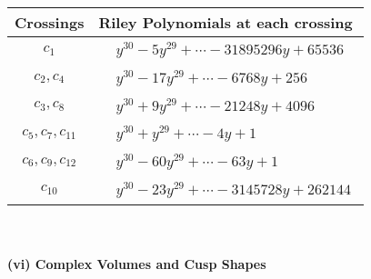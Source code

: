 \documentclass[1p]{elsarticle_modified}
\theoremstyle{definition}
\begin{document}
\begin{tabular}{m{50pt}|m{274pt}}
Crossings & \hspace{64pt}Riley Polynomials at each crossing \\
\hline $$\begin{aligned}c_{1}\end{aligned}$$&$\begin{aligned}
&y^{30}-5 y^{29}+\cdots-31895296 y+65536
\end{aligned}$\\
\hline $$\begin{aligned}c_{2},c_{4}\end{aligned}$$&$\begin{aligned}
&y^{30}-17 y^{29}+\cdots-6768 y+256
\end{aligned}$\\
\hline $$\begin{aligned}c_{3},c_{8}\end{aligned}$$&$\begin{aligned}
&y^{30}+9 y^{29}+\cdots-21248 y+4096
\end{aligned}$\\
\hline $$\begin{aligned}c_{5},c_{7},c_{11}\end{aligned}$$&$\begin{aligned}
&y^{30}+y^{29}+\cdots-4 y+1
\end{aligned}$\\
\hline $$\begin{aligned}c_{6},c_{9},c_{12}\end{aligned}$$&$\begin{aligned}
&y^{30}-60 y^{29}+\cdots-63 y+1
\end{aligned}$\\
\hline $$\begin{aligned}c_{10}\end{aligned}$$&$\begin{aligned}
&y^{30}-23 y^{29}+\cdots-3145728 y+262144
\end{aligned}$\\
\hline
\end{tabular}\\~\\
\newpage\flushleft \textbf{(vi) Complex Volumes and Cusp Shapes}
\end{document}
